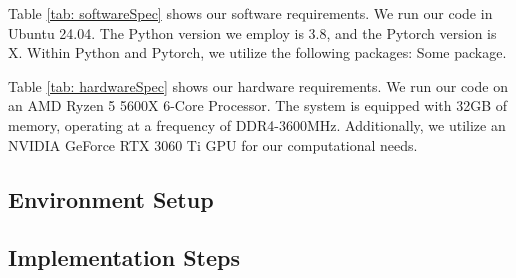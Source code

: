 \begin{ZhChapter}
Table \ref{tab: softwareSpec} shows our software requirements. We run our code in Ubuntu 24.04. The Python version we employ is 3.8, and the Pytorch version is X. Within Python and Pytorch, we utilize the following packages: Some package.

\begin{table*}[htbp]
\centering
\caption{Hardware requirements} \label{tab: hardwareSpec}
\end {table*}

Table \ref{tab: hardwareSpec} shows our hardware requirements. We run our code on an AMD Ryzen 5 5600X 6-Core Processor. The system is equipped with 32GB of memory, operating at a frequency of DDR4-3600MHz. Additionally, we utilize an NVIDIA GeForce RTX 3060 Ti GPU for our computational needs.
\subsection{Environment Setup}

\subsection{Implementation Steps}



\end{ZhChapter}
